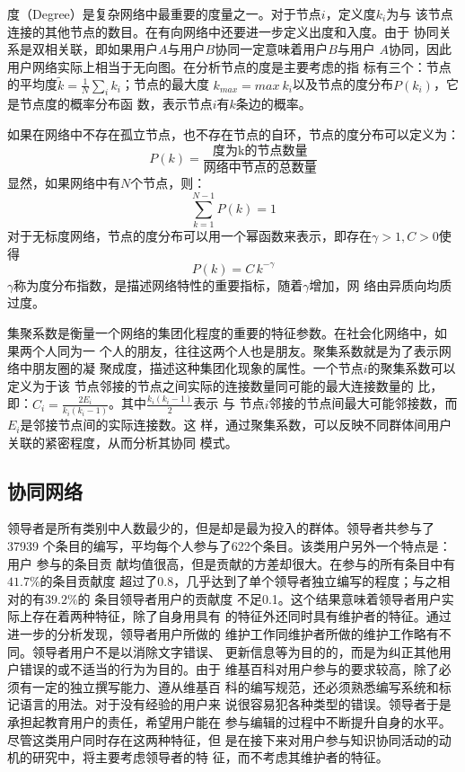 度（Degree）是复杂网络中最重要的度量之一。对于节点$i$，定义度$k_i$为与
该节点连接的其他节点的数目。在有向网络中还要进一步定义出度和入度。由于
协同关系是双相关联，即如果用户$A$与用户$B$协同一定意味着用户$B$与用户
$A$协同，因此用户网络实际上相当于无向图。在分析节点的度是主要考虑的指
标有三个：节点的平均度$\tilde{ k}=\frac{1}{N}\sum_i k_i$；节点的最大度
$k_{max}=max \  k_i$以及节点的度分布$P(k_i)$，它是节点度的概率分布函
数，表示节点$i$有$k$条边的概率。

如果在网络中不存在孤立节点，也不存在节点的自环，节点的度分布可以定义为：
\[
P(k)=\frac{\text{度为k的节点数量}}{\text{网络中节点的总数量}}
\]
显然，如果网络中有$N$个节点，则：
\[
\sum_{k=1}^{N-1}P(k)=1
\]
对于无标度网络，节点的度分布可以用一个幂函数来表示，即存在$\gamma>1,
C>0$使得
\[
P(k)= C \, k^{- \gamma}
\]
$\gamma$称为度分布指数，是描述网络特性的重要指标，随着$\gamma$增加，网
络由异质向均质过度。

集聚系数是衡量一个网络的集团化程度的重要的特征参数。在社会化网络中，如
果两个人同为一
个人的朋友，往往这两个人也是朋友。聚集系数就是为了表示网络中朋友圈的凝
聚成度，描述这种集团化现象的属性。一个节点$i$的聚集系数可以定义为于该
节点邻接的节点之间实际的连接数量同可能的最大连接数量的
比，即：$C_i=\frac{2E_i}{k_i(k_i-1)}$。其中$\frac{k_i(k_i-1)}{2}$表示
与
节点$i$邻接的节点间最大可能邻接数，而$E_i$是邻接节点间的实际连接数。这
样，通过聚集系数，可以反映不同群体间用户关联的紧密程度，从而分析其协同
模式。

\subsection{协同网络}


领导者是所有类别中人数最少的，但是却是最为投入的群体。领导者共参与了37939
个条目的编写，平均每个人参与了622个条目。该类用户另外一个特点是：用户
参与的条目贡
献均值很高，但是贡献的方差却很大。在参与的所有条目中有$41.7\%$的条目贡献度
超过了0.8，几乎达到了单个领导者独立编写的程度；与之相对的有$39.2\%$的
条目领导者用户的贡献度
不足0.1。这个结果意味着领导者用户实际上存在着两种特征，除了自身用具有
的特征外还同时具有维护者的特征。通过进一步的分析发现，领导者用户所做的
维护工作同维护者所做的维护工作略有不同。领导者用户不是以消除文字错误、
更新信息等为目的的，而是为纠正其他用户错误的或不适当的行为为目的。由于
维基百科对用户参与的要求较高，除了必须有一定的独立撰写能力、遵从维基百
科的编写规范，还必须熟悉编写系统和标记语言的用法。对于没有经验的用户来
说很容易犯各种类型的错误。领导者于是承担起教育用户的责任，希望用户能在
参与编辑的过程中不断提升自身的水平。尽管这类用户同时存在这两种特征，但
是在接下来对用户参与知识协同活动的动机的研究中，将主要考虑领导者的特
征，而不考虑其维护者的特征。

